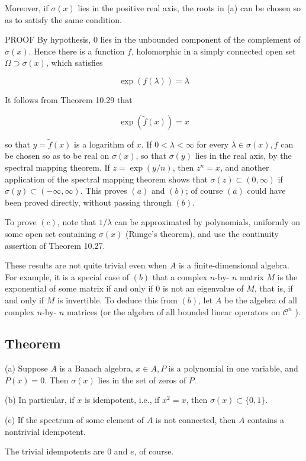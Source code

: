 \documentclass[10pt]{article}
\begin{document}
Moreover, if $\sigma(x)$ lies in the positive real axis, the roots in (a) can be chosen so as to satisfy the same condition.

PROOF By hypothesis, 0 lies in the unbounded component of the complement of $\sigma(x)$. Hence there is a function $f$, holomorphic in a simply connected open set $\Omega \supset \sigma(x)$, which satisfies

$$
\exp (f(\lambda))=\lambda
$$

It follows from Theorem 10.29 that

$$
\exp (\tilde{f}(x))=x
$$

so that $y=\tilde{f}(x)$ is a logarithm of $x$. If $0<\lambda<\infty$ for every $\lambda \in \sigma(x), f$ can be chosen so as to be real on $\sigma(x)$, so that $\sigma(y)$ lies in the real axis, by the spectral mapping theorem. If $z=\exp (y / n)$, then $z^{n}=x$, and another application of the spectral mapping theorem shows that $\sigma(z) \subset(0, \infty)$ if $\sigma(y) \subset(-\infty, \infty)$. This proves $(a)$ and $(b)$; of course $(a)$ could have been proved directly, without passing through $(b)$.

To prove $(c)$, note that $1 / \lambda$ can be approximated by polynomials, uniformly on some open set containing $\sigma(x)$ (Runge's theorem), and use the continuity assertion of Theorem 10.27.

These results are not quite trivial even when $A$ is a finite-dimensional algebra. For example, it is a special case of $(b)$ that a complex $n$-by- $n$ matrix $M$ is the exponential of some matrix if and only if 0 is not an eigenvalue of $M$, that is, if and only if $M$ is invertible. To deduce this from $(b)$, let $A$ be the algebra of all complex $n$-by- $n$ matrices (or the algebra of all bounded linear operators on $\mathscr{C}^{n}$ ).

\subsection{Theorem}
(a) Suppose $A$ is a Banach algebra, $x \in A, P$ is a polynomial in one variable, and $P(x)=0$. Then $\sigma(x)$ lies in the set of zeros of $P$.

(b) In particular, if $x$ is idempotent, i.e., if $x^{2}=x$, then $\sigma(x) \subset\{0,1\}$.

(c) If the spectrum of some element of $A$ is not connected, then $A$ contains a nontrivial idempotent.

The trivial idempotents are 0 and $e$, of course.
\end{document}
